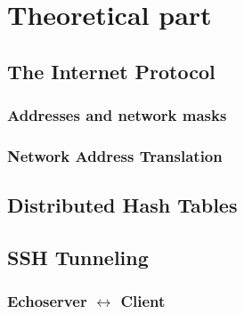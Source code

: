 \section{Theoretical part}

\subsection{The Internet Protocol}
\subsubsection{Addresses and network masks}

\subsubsection{Network Address Translation}

\subsection{Distributed Hash Tables}

\subsection{SSH Tunneling}
\subsubsection{{\sc Echoserver} $\leftrightarrow$ {\sc Client}}
